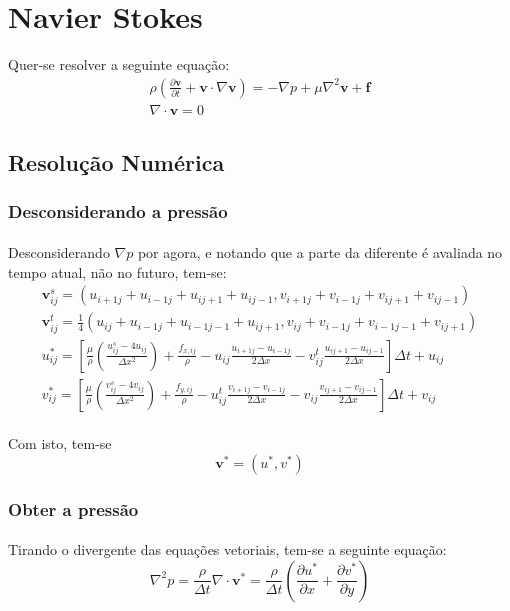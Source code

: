 \documentclass[a4paper,11pt]{article}
\title{}
\author{Ataias Reis}
\begin{document}
\section{Navier Stokes}
Quer-se resolver a seguinte equação:
\begin{eqnarray}
\rho\left( \frac{\partial \textbf{v}}{\partial t}+\textbf{v}\cdot\nabla\textbf{v}\right)=-\nabla p+\mu\nabla^2\textbf{v}+\textbf{f}\\
\nabla\cdot \textbf{v}=0
\end{eqnarray}
\subsection{Resolução Numérica}
\subsubsection{Desconsiderando a pressão}
\paragraph{} Desconsiderando $\nabla p$ por agora, e notando que a parte da diferente é avaliada no tempo atual, não no futuro, tem-se:
\begin{eqnarray}
\textbf{v}_{ij}^s=(u_{i+1j}+u_{i-1j}+u_{ij+1}+u_{ij-1},v_{i+1j}+v_{i-1j}+v_{ij+1}+v_{ij-1})\\
\textbf{v}_{ij}^t=\frac{1}{4}(u_{ij}+u_{i-1j}+u_{i-1j-1}+u_{ij+1},v_{ij}+v_{i-1j}+v_{i-1j-1}+v_{ij+1})\\
u_{ij}^{*}=\left[\frac{\mu}{\rho}\left(\frac{u_{ij}^s-4u_{ij}}{\Delta x^2}\right)+\frac{f_{x,ij}}{\rho}-u_{ij}\frac{u_{i+1j}-u_{i-1j}}{2\Delta x}-v_{ij}^t\frac{u_{ij+1}-u_{ij-1}}{2\Delta x}\right]\Delta t + u_{ij}\\
v_{ij}^{*}=\left[\frac{\mu}{\rho}\left(\frac{v_{ij}^s-4v_{ij}}{\Delta x^2}\right)+\frac{f_{y,ij}}{\rho}-u_{ij}^t\frac{v_{i+1j}-v_{i-1j}}{2\Delta x}-v_{ij}\frac{v_{ij+1}-v_{ij-1}}{2\Delta x}\right]\Delta t + v_{ij}
\end{eqnarray}

\paragraph{} Com isto, tem-se \[\textbf{v}^{*}=(u^*,v^*)\]
\subsubsection{Obter a pressão}
\paragraph{} Tirando o divergente das equações vetoriais, tem-se a seguinte equação:
\begin{equation}
\nabla^2 p = \frac{\rho}{\Delta t} \nabla\cdot \textbf{v}^*=\frac{\rho}{\Delta t} 
\left( \frac{\partial u^*}{\partial x}+\frac{\partial v^*}{\partial y} \right)
\end{equation}
\end{document}
